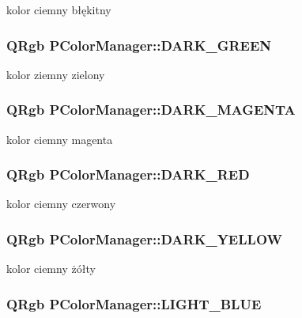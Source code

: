 kolor ciemny błękitny \hypertarget{classPColorManager_ec8d0fe14a68b42be5c5d8d77f914411}{
\subsubsection[{DARK\_\-GREEN}]{\setlength{\rightskip}{0pt plus 5cm}QRgb {\bf PColorManager::DARK\_\-GREEN}}}
\label{classPColorManager_ec8d0fe14a68b42be5c5d8d77f914411}


kolor ziemny zielony \hypertarget{classPColorManager_eabafba23c771c3ad19f67938e11f68b}{
\subsubsection[{DARK\_\-MAGENTA}]{\setlength{\rightskip}{0pt plus 5cm}QRgb {\bf PColorManager::DARK\_\-MAGENTA}}}
\label{classPColorManager_eabafba23c771c3ad19f67938e11f68b}


kolor ciemny magenta \hypertarget{classPColorManager_3690840932799e3d910dd3d673f90363}{
\subsubsection[{DARK\_\-RED}]{\setlength{\rightskip}{0pt plus 5cm}QRgb {\bf PColorManager::DARK\_\-RED}}}
\label{classPColorManager_3690840932799e3d910dd3d673f90363}


kolor ciemny czerwony \hypertarget{classPColorManager_347da61b74a87e7eed4b8849a8128e11}{
\subsubsection[{DARK\_\-YELLOW}]{\setlength{\rightskip}{0pt plus 5cm}QRgb {\bf PColorManager::DARK\_\-YELLOW}}}
\label{classPColorManager_347da61b74a87e7eed4b8849a8128e11}


kolor ciemny żółty \hypertarget{classPColorManager_861249c4294f958c0043a1d1b7468435}{
\subsubsection[{LIGHT\_\-BLUE}]{\setlength{\rightskip}{0pt plus 5cm}QRgb {\bf PColorManager::LIGHT\_\-BLUE}}}
\label{classPColorManager_861249c4294f958c0043a1d1b7468435}


